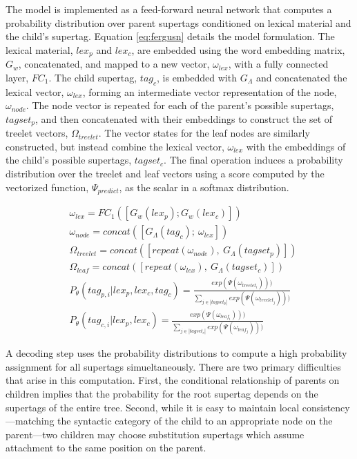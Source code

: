 \documentclass[11pt]{article}
\begin{document}
The model is implemented as a feed-forward neural network that computes a probability distribution over parent supertags conditioned on lexical material and the child's supertag.
%
Equation \ref{eq:fergusn} details the model formulation.
%
The lexical material, $lex_p$ and $lex_c$, are embedded using the word embedding matrix, $G_w$, concatenated, and mapped to a new vector, $\omega_{lex}$, with a fully connected layer, $FC_1$.
%
The child supertag, $tag_c$, is embedded with $G_\Lambda$ and concatenated the lexical vector, $\omega_{lex}$, forming an intermediate vector representation of the node, $\omega_{node}$.
%
The node vector is repeated for each of the parent's possible supertags, $tagset_p$, and then concatenated with their embeddings to construct the set of treelet vectors, $\Omega_{treelet}$.
%
The vector states for the leaf nodes are similarly constructed, but instead combine the lexical vector, $\omega_{lex}$ with the embeddings of the child's possible supertags, $tagset_c$.
%
The final operation induces a probability distribution over the treelet and leaf vectors using a score computed by the vectorized function, $\Psi_{predict}$, as the scalar in a softmax distribution. 

\begin{align}
&\omega_{lex} = FC_1([G_w(lex_p); G_w(lex_c)]) \label{eq:fergusn} \\
&\omega_{node}=concat([G_\Lambda(tag_c);~\omega_{lex}]) \nonumber \\
&\Omega_{treelet} = concat([repeat(\omega_{node}),~G_\Lambda(tagset_p)]) \nonumber \\
&\Omega_{leaf} = concat([repeat(\omega_{lex}),~G_\Lambda(tagset_c)]) \nonumber \\
&P_\theta(tag_{p,i} | lex_{p}, lex_{c}, tag_{c})=
\frac{exp(\Psi(\omega_{treelet_i})))}
{\sum_{j \in |tagset_p|} exp(\Psi(\omega_{treelet_j})))} \nonumber \\
&P_\theta(tag_{c,i} |lex_{p}, lex_{c}) = 
\frac{exp(\Psi(\omega_{leaf_i})))}
{\sum_{j \in |tagset_c|} exp(\Psi(\omega_{leaf_j})))} \nonumber 
\end{align}


A decoding step uses the probability distributions to compute a high probability assignment for all supertags simueltaneously.
%
There are two primary difficulties that arise in this computation.
%
First, the conditional relationship of parents on children implies that the probability for the root supertag depends on the supertags of the entire tree.
%
Second, while it is easy to maintain local consistency---matching the syntactic
category of the child to an appropriate node on the parent---two children may choose substitution supertags which assume attachment to the same position on the parent.
\end{document}
